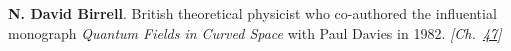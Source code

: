 \textbf{N. David Birrell}. British theoretical physicist who co-authored the influential monograph \emph{Quantum Fields in Curved Space} with Paul Davies in 1982. \emph{[Ch.~\hyperref[ch:observervac]{47}]}


